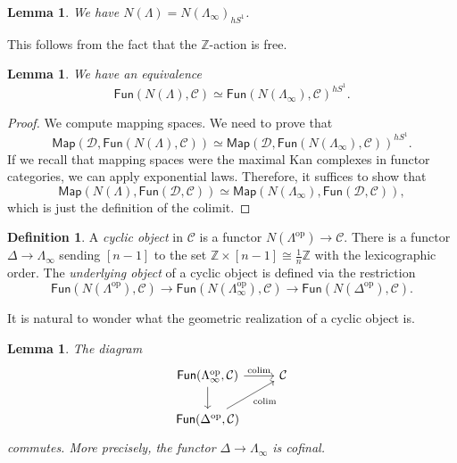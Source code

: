 \documentclass[10pt, oneside]{memoir}
\newtheorem{lem}[thm]{Lemma}
\theoremstyle{definition}
\newtheorem{defn}[thm]{Definition}
\theoremstyle{remark}
\theoremstyle{plain}
\theoremstyle{definition}
\theoremstyle{remark}
\newcommand{\Z}{\mathbb{Z}}
\newcommand{\mc}[1]{\mathcal{#1}}
\newcommand{\ms}[1]{\mathsf{#1}}
\newcommand{\1}{\mathbf{1}}
\newcommand{\2}{\mathbf{2}}
\newcommand{\3}{\mathbf{3}}
\DeclareMathOperator{\op}{op}
\DeclareMathOperator*{\colim}{colim}
\begin{document}
\begin{lem}
    We have \(N(\Lambda) = N(\Lambda_{\infty})_{hS^1} \).
\end{lem}

This follows from the fact that the \(\Z \)-action is free.

\begin{lem}
    We have an equivalence
    \[ \ms{Fun}(N(\Lambda), \mc{C}) \simeq \ms{Fun}(N(\Lambda_{\infty}), \mc{C})^{hS^1}. \]
\end{lem}

\begin{proof}
    We compute mapping spaces. We need to prove that
    \[ \ms{Map}(\mc{D}, \ms{Fun}(N(\Lambda), \mc{C})) \simeq \ms{Map}(\mc{D}, \ms{Fun}(N(\Lambda_{\infty}), \mc{C}))^{hS^1}. \]
    If we recall that mapping spaces were the maximal Kan complexes in functor categories, we can apply exponential laws. Therefore, it suffices to show that
    \[ \ms{Map}(N(\Lambda), \ms{Fun}(\mc{D}, \mc{C})) \simeq \ms{Map}(N(\Lambda_{\infty}), \ms{Fun}(\mc{D}, \mc{C})), \]
    which is just the definition of the colimit.
\end{proof}

\begin{defn}
    A \textit{cyclic object} in \(\mc{C} \) is a functor \(N(\Lambda^{\op}) \to \mc{C} \).
    There is a functor \(\Delta \to \Lambda_{\infty} \) sending \([n-1] \) to the set \(\Z \times [n-1] \cong \frac{1}{n} \Z \) with the lexicographic order. The \textit{underlying object} of a cyclic object is defined via the restriction
    \[ \ms{Fun}(N(\Lambda^{\op}), \mc{C}) \to \ms{Fun}(N(\Lambda_{\infty}^{\op}), \mc{C}) \to \ms{Fun}(N(\Delta^{\op}), \mc{C}). \]
\end{defn}

It is natural to wonder what the geometric realization of a cyclic object is.

\begin{lem}
    The diagram
    \begin{equation*}
    \begin{tikzcd}
        \ms{Fun}(\Lambda_{\infty}^{\op}, \mc{C}) \ar{r}{\colim} \ar{d} & \mc{C} \\
        \ms{Fun}(\Delta^{\op}, \mc{C}) \ar[swap]{ur}{\colim}
    \end{tikzcd}
    \end{equation*}
    commutes. More precisely, the functor \(\Delta \to \Lambda_{\infty} \) is cofinal.
\end{lem}
\end{document}
